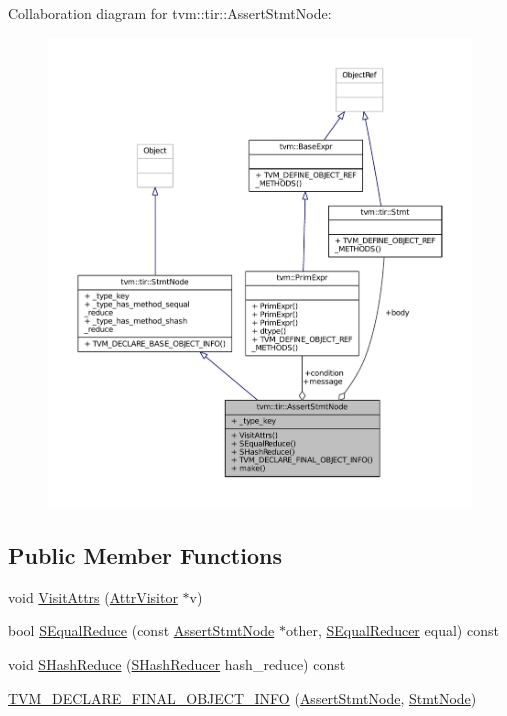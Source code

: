 Collaboration diagram for tvm\+:\+:tir\+:\+:Assert\+Stmt\+Node\+:
\nopagebreak
\begin{figure}[H]
\begin{center}
\leavevmode
\includegraphics[width=350pt]{classtvm_1_1tir_1_1AssertStmtNode__coll__graph}
\end{center}
\end{figure}
\subsection*{Public Member Functions}
\begin{DoxyCompactItemize}
\item 
void \hyperlink{classtvm_1_1tir_1_1AssertStmtNode_ad4b51bee8779971bed4bdfeb72006d99}{Visit\+Attrs} (\hyperlink{classtvm_1_1AttrVisitor}{Attr\+Visitor} $\ast$v)
\item 
bool \hyperlink{classtvm_1_1tir_1_1AssertStmtNode_a95e359c096097dacf07eeaefd1977826}{S\+Equal\+Reduce} (const \hyperlink{classtvm_1_1tir_1_1AssertStmtNode}{Assert\+Stmt\+Node} $\ast$other, \hyperlink{classtvm_1_1SEqualReducer}{S\+Equal\+Reducer} equal) const 
\item 
void \hyperlink{classtvm_1_1tir_1_1AssertStmtNode_af951b4bd4d85da16e19cdf546a447c1f}{S\+Hash\+Reduce} (\hyperlink{classtvm_1_1SHashReducer}{S\+Hash\+Reducer} hash\+\_\+reduce) const 
\item 
\hyperlink{classtvm_1_1tir_1_1AssertStmtNode_a63080edac8e68a1358affcc192b747c6}{T\+V\+M\+\_\+\+D\+E\+C\+L\+A\+R\+E\+\_\+\+F\+I\+N\+A\+L\+\_\+\+O\+B\+J\+E\+C\+T\+\_\+\+I\+N\+FO} (\hyperlink{classtvm_1_1tir_1_1AssertStmtNode}{Assert\+Stmt\+Node}, \hyperlink{classtvm_1_1tir_1_1StmtNode}{Stmt\+Node})
\end{DoxyCompactItemize}
